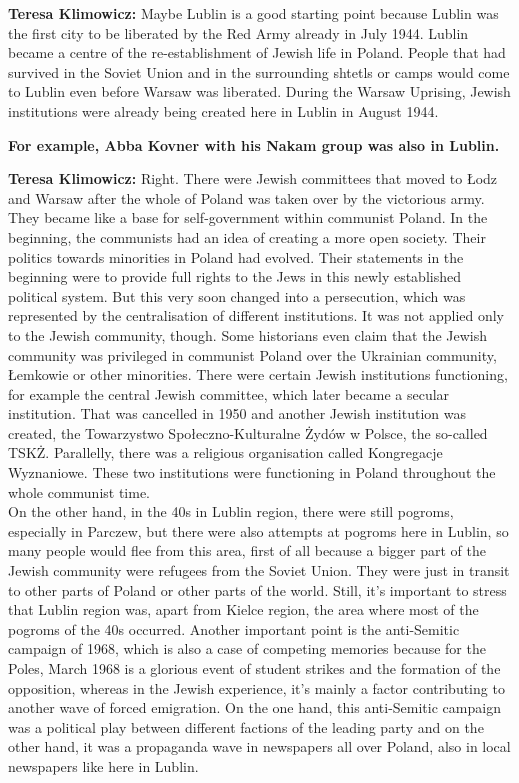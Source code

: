 \textbf{Teresa Klimowicz:} Maybe Lublin is a good starting point because Lublin was the first city to be liberated by the Red Army already in July 1944. Lublin became a centre of the re-establishment of Jewish life in Poland. People that had survived in the Soviet Union and in the surrounding shtetls or camps would come to Lublin even before Warsaw was liberated. During the Warsaw Uprising, Jewish institutions were already being created here in Lublin in August 1944. 

\textbf{For example, Abba Kovner with his Nakam group was also in Lublin.} 

\textbf{Teresa Klimowicz:} Right. There were Jewish committees that moved to Łodz and Warsaw after the whole of Poland was taken over by the victorious army. They became like a base for self-government within communist Poland. In the beginning, the communists had an idea of creating a more open society. Their politics towards minorities in Poland had evolved. Their statements in the beginning were to provide full rights to the Jews in this newly established political system. But this very soon changed into a persecution, which was represented by the centralisation of different institutions. It was not applied only to the Jewish community, though. Some historians even claim that the Jewish community was privileged in communist Poland over the Ukrainian community, Łemkowie or other minorities. There were certain Jewish institutions functioning, for example the central Jewish committee, which later became a secular institution. That was cancelled in 1950 and another Jewish institution was created, the Towarzystwo Społeczno-Kulturalne Żydów w Polsce, the so-called TSKŻ. Parallelly, there was a religious organisation called Kongregacje Wyznaniowe. These two institutions were functioning in Poland throughout the whole communist time.\\
On the other hand, in the 40s in Lublin region, there were still pogroms, especially in Parczew, but there were also attempts at pogroms here in Lublin, so many people would flee from this area, first of all because a bigger part of the Jewish community were refugees from the Soviet Union. They were just in transit to other parts of Poland or other parts of the world. Still, it's important to stress that Lublin region was, apart from Kielce region, the area where most of the pogroms of the 40s occurred. Another important point is the anti-Semitic campaign of 1968, which is also a case of competing memories because for the Poles, March 1968 is a glorious event of student strikes and the formation of the opposition, whereas in the Jewish experience, it's mainly a factor contributing to another wave of forced emigration. On the one hand, this anti-Semitic campaign was a political play between different factions of the leading party and on the other hand, it was a propaganda wave in newspapers all over Poland, also in local newspapers like here in Lublin.  

